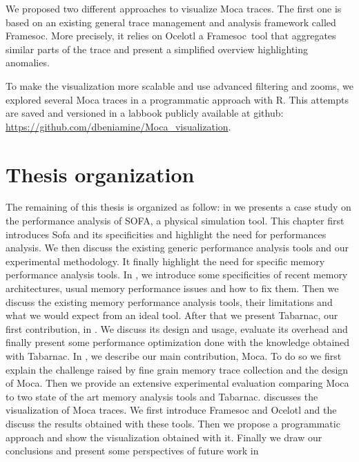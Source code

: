 We proposed two different approaches to visualize \gls{Moca} traces.
The first one is based on an existing general trace management and analysis framework called \gls{Framesoc}.
More precisely, it relies on \gls{Ocelotl} a \gls{Framesoc} tool that aggregates similar parts of the trace and present a simplified overview highlighting anomalies.

To make the visualization more scalable and use advanced filtering and zooms, we explored several \gls{Moca} traces in a programmatic approach with \gls{R}.
This attempts are saved and versioned in a labbook publicly available at github: \url{https://github.com/dbeniamine/Moca_visualization}.

\section{Thesis organization}

The remaining of this thesis is organized as follow:
in  we presents a case study on the performance analysis of \gls{SOFA}, a physical simulation tool.
This chapter first introduces \gls{Sofa} and its specificities and highlight the need for performances analysis.
We then discuss the existing generic performance analysis tools and our experimental methodology.
It finally highlight the need for specific memory performance analysis tools.
In , we introduce some specificities of recent memory architectures, usual memory performance issues and how to fix them.
Then we discuss the existing memory performance analysis tools, their limitations and what we would expect from an ideal tool.
After that we present \gls{Tabarnac}, our first contribution, in .
We discuss its design and usage, evaluate its overhead and finally present some performance optimization done with the knowledge obtained with \gls{Tabarnac}.
In , we describe our main contribution, \gls{Moca}.
To do so we first explain the challenge raised by fine grain memory trace collection and the design of \gls{Moca}.
Then we provide an extensive experimental evaluation comparing \gls{Moca} to two state of the art memory analysis tools and \gls{Tabarnac}.
 discusses the visualization of \gls{Moca} traces.
We first introduce \gls{Framesoc} and \gls{Ocelotl} and the discuss the results obtained with these tools.
Then we propose a programmatic approach and show the visualization obtained with it.
Finally we draw our conclusions and present some perspectives of future work in 
